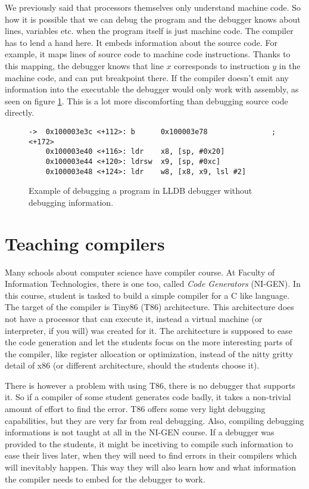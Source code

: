 We previously said that processors themselves only understand machine code. So
how it is possible that we can debug the program and the debugger knows about
lines, variables etc. when the program itself is just machine code. The
compiler has to lend a hand here. It embeds information about the source code.
For example, it maps lines of source code to machine code instructions. Thanks
to this mapping, the debugger knows that line $x$ corresponds to instruction
$y$ in the machine code, and can put breakpoint there. If the compiler doesn't
emit any information into the executable the debugger would only work with
assembly, as seen on figure \ref{fig:lldb-debug2}. This is a lot more
discomforting than debugging source code directly.

\begin{figure}\label{fig:lldb-debug2}
\begin{lstlisting}
->  0x100003e3c <+112>: b      0x100003e78               ; <+172>
    0x100003e40 <+116>: ldr    x8, [sp, #0x20]
    0x100003e44 <+120>: ldrsw  x9, [sp, #0xc]
    0x100003e48 <+124>: ldr    w8, [x8, x9, lsl #2]
\end{lstlisting}
\caption{Example of debugging a program in LLDB debugger without debugging information.}
\end{figure}

\section{Teaching compilers}
Many schools about computer science have compiler course. At Faculty of
Information Technologies, there is one too, called \textit{Code Generators}
(NI-GEN). In this course, student is tasked to build a simple compiler for a C
like language. The target of the compiler is Tiny86 (T86) architecture. This
architecture  does not have a
processor that can execute it, instead a virtual machine (or interpreter, if
you will) was created for it. The architecture is supposed to ease the code
generation and let the students focus on the more interesting parts of the
compiler, like register allocation or optimization, instead of the nitty gritty
detail of x86 (or different architecture, should the students choose it).

There is however a problem with using T86, there is no debugger that supports
it. So if a compiler of some student generates code badly, it takes a
non-trivial amount of effort to find the error. T86 offers some very light
debugging capabilities, but they are very far from real debugging. Also,
compiling debugging informations is not taught at all in the NI-GEN course. If
a debugger was provided to the students, it might be incetiving to compile such
information to ease their lives later, when they will need to find errors in
their compilers which will inevitably happen. This way they will also learn how
and what information the compiler needs to embed for the debugger to work.

